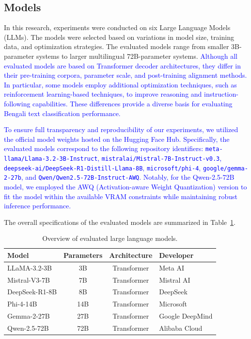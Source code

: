 \documentclass[10pt,letterpaper]{article}
\newcommand{\rev}[1]{\textcolor{blue}{#1}}
\begin{document}
\subsection*{Models}
In this research, experiments were conducted on six Large Language Models (LLMs). 
The models were selected based on variations in model size, training data, and 
optimization strategies. The evaluated models range from smaller 3B-parameter 
systems to larger multilingual 72B-parameter systems. \rev{Although all evaluated 
models are based on Transformer decoder architectures, they differ in their 
pre-training corpora, parameter scale, and post-training alignment methods. 
In particular, some models employ additional optimization techniques, such as 
reinforcement learning-based techniques, to improve reasoning and 
instruction-following capabilities. These differences provide a diverse basis 
for evaluating Bengali text classification performance.}

\rev{To ensure full transparency and reproducibility of our experiments, we utilized the official model weights hosted on the Hugging Face Hub. Specifically, the evaluated models correspond to the following repository identifiers: \texttt{meta-llama/Llama-3.2-3B-Instruct}, \texttt{mistralai/Mistral-7B-Instruct-v0.3}, \texttt{deepseek-ai/DeepSeek-R1-Distill-Llama-8B}, \texttt{microsoft/phi-4}, \texttt{google/gemma-2-27b}, and \texttt{Qwen/Qwen2.5-72B-Instruct-AWQ}. Notably, for the Qwen-2.5-72B model, we employed the AWQ (Activation-aware Weight Quantization) version to fit the model within the available VRAM constraints while maintaining robust inference performance.}

The overall specifications of the evaluated models are summarized in Table~\ref{tab:models}.

\begin{table}[!t]
\centering
\small
\caption{Overview of evaluated large language models.}
\label{tab:models}
\renewcommand{\arraystretch}{1.2}
\setlength{\tabcolsep}{6pt}

\begin{tabularx}{\columnwidth}{|l|c|c|X|}
\hline
\textbf{Model} & \textbf{Parameters} & \textbf{Architecture} & \textbf{Developer} \\\hline
LLaMA-3.2-3B   & 3B  & Transformer        & Meta AI \\\hline
Mistral-V3-7B  & 7B  & Transformer        & Mistral AI \\\hline
DeepSeek-R1-8B & 8B  & Transformer        & DeepSeek \\\hline
Phi-4-14B      & 14B & Transformer        & Microsoft \\\hline
Gemma-2-27B    & 27B & Transformer        & Google DeepMind \\\hline
Qwen-2.5-72B   & 72B & Transformer        & Alibaba Cloud \\\hline
\end{tabularx}

\end{table}
\end{document}
